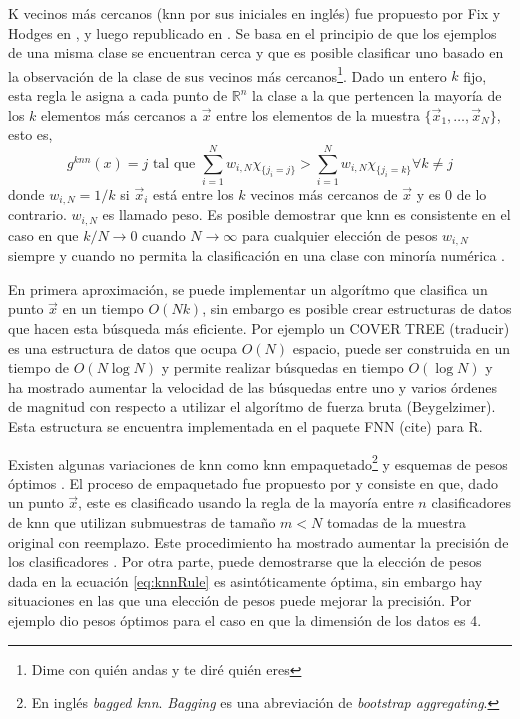 \documentclass[letterpaper,12pt]{book}
\begin{document}
K vecinos más cercanos (knn por sus iniciales en inglés) fue propuesto por Fix y Hodges en \cite{fix_discriminatory_1951}, y luego republicado en  \cite{silverman_e._1989}. Se basa en el principio de que los ejemplos de una misma clase se encuentran cerca y que es posible clasificar uno basado en la observación de la clase de sus vecinos más cercanos\footnote{Dime con quién andas y te diré quién eres}. Dado un entero $k$ fijo, esta regla le asigna a cada punto de $\mathbb{R}^n$ la clase a la que pertencen la mayoría de los $k$ elementos más cercanos a $\vec{x}$ entre los elementos de la muestra $\{\vec{x}_1, \dots,\vec{x}_N\}$, esto es,
\begin{equation}\label{eq:knnRule}
 g^{knn}(x) = j  \text{ tal que } \sum_{i=1}^{N}w_{i,N}\chi_{\{j_i = j\}} > \sum_{i=1}^{N}w_{i,N}\chi_{\{j_i = k\}}\forall k\neq j
\end{equation} 
donde $w_{i,N} = 1/k$ si $\vec{x}_i$ está entre los $k$ vecinos más cercanos de $\vec{x}$ y es $0$ de lo contrario. $w_{i,N}$ es llamado peso. Es posible demostrar que knn es consistente en el caso en que $k/N\to 0$ cuando $N\to \infty$ para cualquier elección de pesos $w_{i,N}$ siempre y cuando no permita la clasificación en una clase con minoría numérica \cite{devroye_probabilistic_1996}.

En primera aproximación, se puede implementar un algorítmo que clasifica un punto $\vec{x}$ en un tiempo $O(Nk)$, sin embargo es posible crear estructuras de datos que hacen esta búsqueda más eficiente. Por ejemplo un COVER TREE (traducir)\cite{beygelzimer_cover_2006} es una estructura de datos que ocupa $O(N)$ espacio, puede ser construida en un tiempo de $O(N\log{N})$ y permite realizar búsquedas en tiempo $O(\log{N})$ y ha mostrado aumentar la velocidad de las búsquedas entre uno y varios órdenes de magnitud con respecto a utilizar el algorítmo de fuerza bruta (Beygelzimer). Esta estructura se encuentra implementada en el paquete FNN (cite) para R.

Existen algunas variaciones de knn como knn empaquetado\footnote{En inglés \textit{bagged knn}. \textit{Bagging} es una abreviación de \textit{bootstrap aggregating}.} \cite{breiman_heuristics_1996, breiman_bagging_1996} y esquemas de pesos óptimos \cite{samworth_optimal_2012}. El proceso de empaquetado fue propuesto por \cite{breiman_heuristics_1996, breiman_bagging_1996} y consiste en que, dado un punto $\vec{x}$, este es clasificado usando la regla de la mayoría entre $n$ clasificadores de knn que utilizan submuestras de tamaño $m<N$ tomadas de la muestra original con reemplazo. Este procedimiento ha mostrado aumentar la precisión de los clasificadores \cite{breiman_bagging_1996}. Por otra parte, puede demostrarse que la elección de pesos dada en la ecuación \ref{eq:knnRule} es asintóticamente óptima, sin embargo hay situaciones en las que una elección de pesos puede mejorar la precisión. Por ejemplo \cite{samworth_optimal_2012} dio pesos óptimos para el caso en que la dimensión de los datos es 4. 
\end{document}
